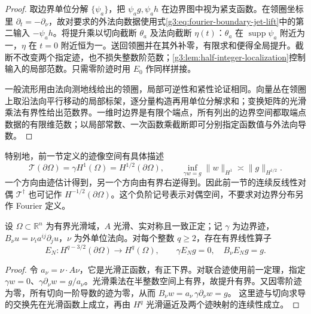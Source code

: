 \begin{proof}
	取边界单位分解 \(\{\psi_a\}\)，把 \(\psi_ag,\psi_ah\) 在边界图中视为紧支函数。在领圈坐标里 \(\partial_t=-\partial_\nu\)，故对要求的外法向数据使用式\eqref{g3:eq:fourier-boundary-jet-lift}中的第二输入 \(-\psi_ah\)。将提升乘以切向截断 \(\theta_a\) 及法向截断 \(\eta(t)\)：\(\theta_a\) 在 \(\operatorname{supp}\psi_a\) 附近为一，\(\eta\) 在 \(t=0\) 附近恒为一。送回领圈并在其外补零，有限求和便得全局提升。截断不改变两个指定迹，也不损失整数阶范数；\cref{g3:lem:half-integer-localization}控制输入的局部范数。只需零阶迹时用 \(E_0\) 作同样拼接。

	一般流形用由法向测地线给出的领圈，局部可逆性和紧性论证相同。向量丛在领圈上取沿法向平行移动的局部标架，逐分量构造再用单位分解求和；变换矩阵的光滑乘法有界性给出范数界。一维时边界是有限个端点，所有列出的边界空间都取端点数据的有限维范数；以局部常数、一次函数乘截断即可分别指定函数值与外法向导数。
\end{proof}

特别地，前一节定义的迹像空间有具体描述
\[
	\mathcal T(\partial\Omega)=\gamma H^1(\Omega)=H^{1/2}(\partial\Omega),
	\qquad
	\inf_{\gamma w=g}\|w\|_{H^1}\asymp\|g\|_{H^{1/2}}.
\]
一个方向由迹估计得到，另一个方向由有界右逆得到。因此前一节的连续反线性对偶 \(\mathcal T^\dagger\) 也可记作 \(H^{-1/2}(\partial\Omega)\)。这个负阶记号表示对偶空间，不要求对边界分布另作 Fourier 定义。

\begin{corollary}\label{g3:cor:boundary-conormal-lifting}
	设 \(\Omega\subset\mathbb R^n\) 为有界光滑域，\(A\) 光滑、实对称且一致正定；记 \(\gamma\) 为边界迹，\(B_\nu u=\nu_i a^{ij}\partial_ju\)，\(\nu\) 为外单位法向。对每个整数 \(q\ge2\)，存在有界线性算子
	\[
	E_N:H^{q-3/2}(\partial\Omega)\longrightarrow H^q(\Omega),
	\qquad \gamma E_Ng=0,\quad B_\nu E_Ng=g.
	\]
\end{corollary}
\begin{proof}
	令 \(a_\nu=\nu\cdot A\nu\)，它是光滑正函数，有正下界。对联合迹使用前一定理，指定
	\(\gamma w=0\)、\(\gamma\partial_\nu w=g/a_\nu\)。光滑乘法在半整数空间上有界，故提升有界。又因零阶迹为零，所有切向一阶导数的迹为零，从而
	\(B_\nu w=a_\nu\,\gamma\partial_\nu w=g\)。
	这里迹与切向求导的交换先在光滑函数上成立，再由 \(H^q\) 光滑逼近及两个迹映射的连续性成立。
\end{proof}

